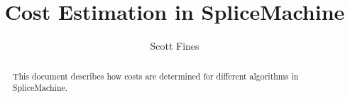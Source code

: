 \documentclass[10pt]{amsart}
\begin{document}
\title{Cost Estimation in SpliceMachine}
\author{Scott Fines}

\begin{abstract}
				This document describes how costs are determined for different algorithms in SpliceMachine. 
\end{abstract}

\maketitle
\end{document}
